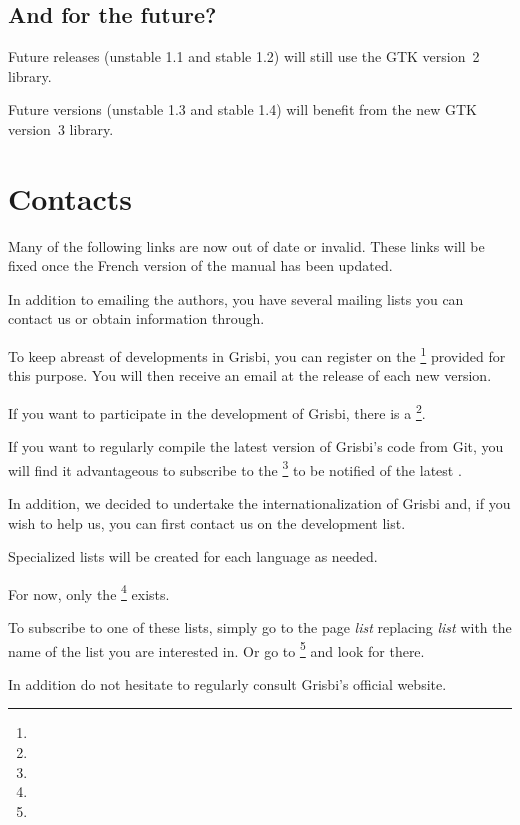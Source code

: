 \subsection{And for the future?}

Future releases (unstable 1.1 and stable 1.2) will still use the \gls{GTK} version~2 library.

Future versions (unstable 1.3 and stable 1.4) will benefit from the new GTK version~3 library.

\section{Contacts\label{introduction-contacts}}

 Many of the following links are now out of date or invalid.  These links will be fixed once the French version of the manual has been updated.

In addition to emailing the authors, you have several mailing lists you can contact us or obtain information through.

To keep abreast of developments in Grisbi, you can register on the \footnote{\urlListInfoEmail{}} provided for this purpose.  You will then receive an email at the release of each new version.

If you want to participate in the development of Grisbi, there is a \footnote{\urlListDevelEmail{}}.

If you want to regularly compile the latest version of Grisbi's code from \gls{Git}, you will find it advantageous to subscribe to the \footnote{\urlListCVSEmail{}} to be notified of the latest .

In addition, we decided to undertake the internationalization of Grisbi and, if you wish to help us, you can first contact us on the development list.

Specialized lists will be created for each language as needed.

For now, only the \footnote{\urlListAnglaiseEmail{}} exists.

To subscribe to one of these lists, simply go to the page
\urlListSF{}\emph{list} replacing \emph{list} with the name of the list you are interested in. Or go to 
\footnote{\urlGrisbi{}} and look for  there.

In addition do not hesitate to regularly consult Grisbi's official website.

